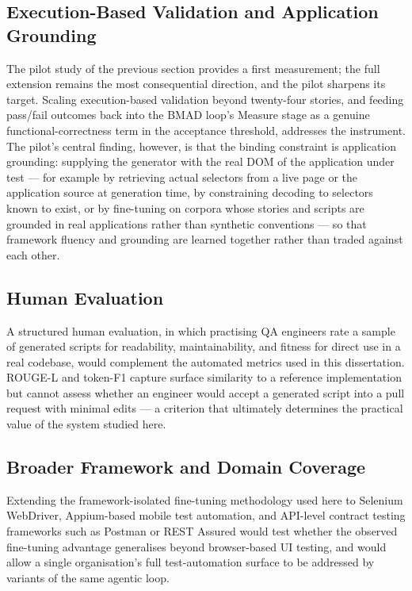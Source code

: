 \subsection{Execution-Based Validation and Application Grounding}

The pilot study of the previous section provides a first measurement;
the full extension remains the most consequential direction, and the
pilot sharpens its target. Scaling execution-based validation beyond
twenty-four stories, and feeding pass/fail outcomes back into the BMAD
loop's Measure stage as a genuine functional-correctness term in the
acceptance threshold, addresses the instrument. The pilot's central
finding, however, is that the binding constraint is application
grounding: supplying the generator with the real DOM of the application
under test --- for example by retrieving actual selectors from a live
page or the application source at generation time, by constraining
decoding to selectors known to exist, or by fine-tuning on corpora whose
stories and scripts are grounded in real applications rather than
synthetic conventions --- so that framework fluency and grounding are
learned together rather than traded against each other.

\subsection{Human Evaluation}

A structured human evaluation, in which practising QA engineers rate a
sample of generated scripts for readability, maintainability, and
fitness for direct use in a real codebase, would complement the
automated metrics used in this dissertation. ROUGE-L and token-F1
capture surface similarity to a reference implementation but cannot
assess whether an engineer would accept a generated script into a pull
request with minimal edits --- a criterion that ultimately determines
the practical value of the system studied here.

\subsection{Broader Framework and Domain Coverage}

Extending the framework-isolated fine-tuning methodology used here to
Selenium WebDriver, Appium-based mobile test automation, and API-level
contract testing frameworks such as Postman or REST Assured would test
whether the observed fine-tuning advantage generalises beyond
browser-based UI testing, and would allow a single organisation's full
test-automation surface to be addressed by variants of the same agentic
loop.

